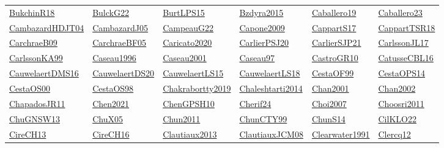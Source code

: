 \begin{longtable}{*{6}{l}}
\hyperref[detail:BukchinR18]{BukchinR18} & \hyperref[detail:BulckG22]{BulckG22} & \hyperref[detail:BurtLPS15]{BurtLPS15} & \hyperref[detail:Bzdyra2015]{Bzdyra2015} & \hyperref[detail:Caballero19]{Caballero19} & \hyperref[detail:Caballero23]{Caballero23}\\ 
\hyperref[detail:CambazardHDJT04]{CambazardHDJT04} & \hyperref[detail:CambazardJ05]{CambazardJ05} & \hyperref[detail:CampeauG22]{CampeauG22} & \hyperref[detail:Capone2009]{Capone2009} & \hyperref[detail:CappartS17]{CappartS17} & \hyperref[detail:CappartTSR18]{CappartTSR18}\\ 
\hyperref[detail:CarchraeB09]{CarchraeB09} & \hyperref[detail:CarchraeBF05]{CarchraeBF05} & \hyperref[detail:Caricato2020]{Caricato2020} & \hyperref[detail:CarlierPSJ20]{CarlierPSJ20} & \hyperref[detail:CarlierSJP21]{CarlierSJP21} & \hyperref[detail:CarlssonJL17]{CarlssonJL17}\\ 
\hyperref[detail:CarlssonKA99]{CarlssonKA99} & \hyperref[detail:Caseau1996]{Caseau1996} & \hyperref[detail:Caseau2001]{Caseau2001} & \hyperref[detail:Caseau97]{Caseau97} & \hyperref[detail:CastroGR10]{CastroGR10} & \hyperref[detail:CatusseCBL16]{CatusseCBL16}\\ 
\hyperref[detail:CauwelaertDMS16]{CauwelaertDMS16} & \hyperref[detail:CauwelaertDS20]{CauwelaertDS20} & \hyperref[detail:CauwelaertLS15]{CauwelaertLS15} & \hyperref[detail:CauwelaertLS18]{CauwelaertLS18} & \hyperref[detail:CestaOF99]{CestaOF99} & \hyperref[detail:CestaOPS14]{CestaOPS14}\\ 
\hyperref[detail:CestaOS00]{CestaOS00} & \hyperref[detail:CestaOS98]{CestaOS98} & \hyperref[detail:Chakrabortty2019]{Chakrabortty2019} & \hyperref[detail:Chaleshtarti2014]{Chaleshtarti2014} & \hyperref[detail:Chan2001]{Chan2001} & \hyperref[detail:Chan2002]{Chan2002}\\ 
\hyperref[detail:ChapadosJR11]{ChapadosJR11} & \hyperref[detail:Chen2021]{Chen2021} & \hyperref[detail:ChenGPSH10]{ChenGPSH10} & \hyperref[detail:Cherif24]{Cherif24} & \hyperref[detail:Choi2007]{Choi2007} & \hyperref[detail:Choosri2011]{Choosri2011}\\ 
\hyperref[detail:ChuGNSW13]{ChuGNSW13} & \hyperref[detail:ChuX05]{ChuX05} & \hyperref[detail:Chun2011]{Chun2011} & \hyperref[detail:ChunCTY99]{ChunCTY99} & \hyperref[detail:ChunS14]{ChunS14} & \hyperref[detail:CilKLO22]{CilKLO22}\\ 
\hyperref[detail:CireCH13]{CireCH13} & \hyperref[detail:CireCH16]{CireCH16} & \hyperref[detail:Clautiaux2013]{Clautiaux2013} & \hyperref[detail:ClautiauxJCM08]{ClautiauxJCM08} & \hyperref[detail:Clearwater1991]{Clearwater1991} & \hyperref[detail:Clercq12]{Clercq12}\\ 

\end{longtable}
